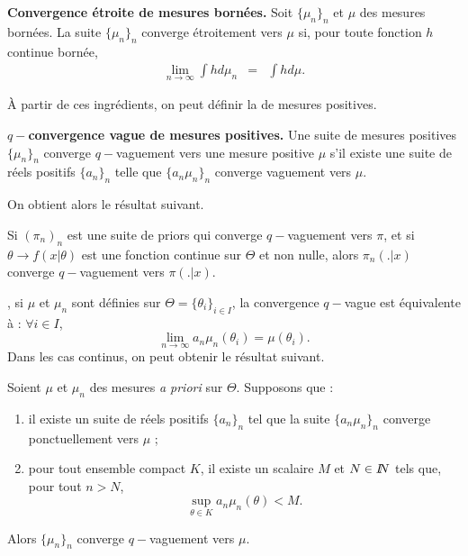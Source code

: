 \begin{definition}{\bf Convergence étroite de mesures bornées.}
Soit $\{\mu_n\}_n$  et $\mu$ des mesures bornées. La suite $\{\mu_n\}_n$ converge
étroitement vers $\mu$ si,  pour toute fonction $h$ continue bornée, 
\begin{eqnarray*}
\lim\limits_{n\to\infty} \int h d\mu_n & = & \int h d\mu.
\end{eqnarray*}
\end{definition}

\`A partir de ces ingrédients, on peut définir la  de mesures positives. 

\begin{definition}{\bf $q-$convergence vague de mesures positives.}
Une suite de mesures positives $\{\mu_n\}_n$ converge $q-$vaguement vers une mesure positive $\mu$ s'il existe une suite de réels positifs $\{a_n\}_n$ telle que $\{a_n \mu_n\}_n$ converge vaguement vers $\mu$. 
\end{definition}

On obtient alors le résultat suivant. \\

\begin{proposition}
Si $(\pi_n)_n$ est une suite de priors qui converge $q-$vaguement vers $\pi$, et si $\theta\to f(x|\theta)$ est une fonction continue sur $\Theta$ et non nulle, alors $\pi_n(.|x)$ converge $q-$vaguement vers $\pi(.|x)$.
\end{proposition}

, si $\mu$ et $\mu_n$ sont définies sur $\Theta=\{\theta_i\}_{i\in I}$, la convergence $q-$vague est équivalente à : $\forall i\in I$, 
$$
\lim\limits_{n\to\infty} a_n \mu_n(\theta_i) = \mu(\theta_i).
$$
{ Dans les cas continus}, on peut obtenir le résultat suivant. 

\begin{proposition}\label{condition.continue}
Soient $\mu$ et $\mu_n$ des mesures {\it a priori} sur $\Theta$. Supposons que :
\begin{enumerate}
\item il existe un suite de réels positifs $\{a_n\}_n$ tel que la suite $\{a_n \mu_n\}_n$ converge ponctuellement vers $\mu$ ; 
\item pour tout ensemble compact $K$, il existe un scalaire $M$ et $N\in I\!\!N$ tels que, pour tout $n>N$, 
$$
\sup_{\theta\in K} a_n \mu_n(\theta) < M.
$$
\end{enumerate}
Alors $\{\mu_n\}_n$ converge $q-$vaguement vers $\mu$.
\end{proposition}

